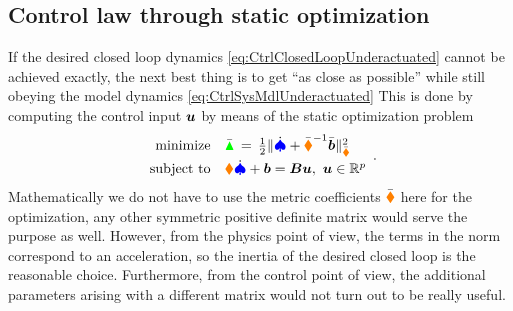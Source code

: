 \subsection{Control law through static optimization}\label{sec:CtrlUnderactuatedOptim}
If the desired closed loop dynamics \eqref{eq:CtrlClosedLoopUnderactuated} cannot be achieved exactly, the next best thing is to get ``as close as possible'' while still obeying the model dynamics \eqref{eq:CtrlSysMdlUnderactuated}
This is done by computing the control input $\sysInput$ by means of the static optimization problem
\begin{align}\label{eq:MinProbUnderactuated}
 \begin{array}{rl}
  \text{minimize} & \GaussianConstraintC \, = \, \tfrac{1}{2} \norm[\sysInertiaMatC]{\sysVeld + \sysInertiaMatC^{-1} \sysForceC}^2
  \\[1ex]
  \text{subject to} & \sysInertiaMat \sysVeld + \sysForce = \sysInputMat \sysInput, \ \sysInput \in \RealNum^\numInputs 
 \end{array}
 .
\end{align}
Mathematically we do not have to use the metric coefficients $\sysInertiaMatC$ here for the optimization, any other symmetric positive definite matrix would serve the purpose as well.
However, from the physics point of view, the terms in the norm correspond to an acceleration, so the inertia of the desired closed loop is the reasonable choice.
Furthermore, from the control point of view, the additional parameters arising with a different matrix would not turn out to be really useful.

